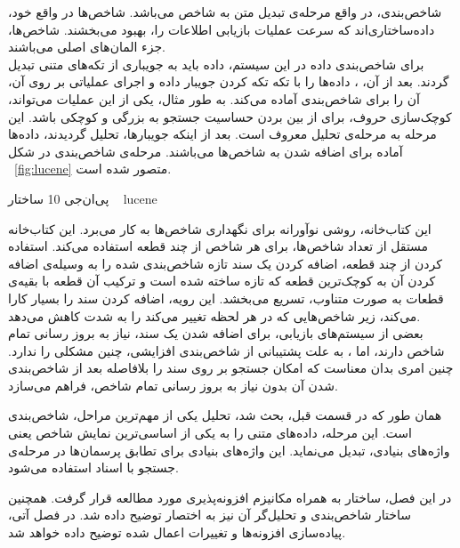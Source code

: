 شاخص‌بندی، در واقع مرحله‌ی تبدیل متن به شاخص می‌باشد. شاخص‌ها در واقع خود، داده‌ساختاری‌اند که سرعت عملیات بازیابی اطلاعات را، بهبود می‌بخشند. شاخص‌ها، جزء المان‌های اصلی   می‌باشند.
\\
برای شاخص‌بندی داده در این سیستم، داده باید به جویباری از تکه‌های متنی تبدیل گردند. بعد از آن، ، داده‌ها را با تکه تکه کردن جویبار داده و اجرای عملیاتی بر روی آن، آن را برای شاخص‌بندی آماده می‌کند. به طور مثال، یکی از این عملیات می‌تواند، کوچک‌سازی حروف، برای از بین بردن حساسیت جستجو به بزرگی و کوچکی باشد. این مرحله به مرحله‌ی تحلیل معروف است. بعد از اینکه جویبارها، تحلیل گردیدند، داده‌ها آماده برای اضافه شدن به شاخص‌ها می‌باشند. مرحله‌ی شاخص‌بندی در شکل ~\ref {fig:lucene} متصور شده است.

‌پی‌ان‌جی {10} {ساختار 
~\cite{Text-search}} {lucene}

این کتاب‌خانه، روشی نوآورانه برای نگهداری شاخص‌ها به کار می‌برد. این کتاب‌خانه مستقل از تعداد شاخص‌ها، برای هر شاخص از چند قطعه استفاده می‌کند. استفاده کردن از چند قطعه، اضافه کردن یک سند تازه شاخص‌بندی شده را به وسیله‌ی اضافه کردن آن به کوچک‌ترین قطعه که تازه ساخته شده است و ترکیب آن قطعه با بقیه‌ی قطعات به صورت متناوب، تسریع می‌بخشد. این رویه، اضافه کردن سند را بسیار کارا می‌کند، زیر شاخص‌هایی که در هر لحظه تغییر می‌کند را به شدت کاهش می‌دهد.
\\
بعضی از سیستم‌های بازیابی، برای اضافه شدن یک سند، نیاز به بروز رسانی تمام شاخص دارند، اما ، به علت پشتیبانی از شاخص‌بندی افزایشی، چنین مشکلی را ندارد. چنین امری بدان معناست که  امکان جستجو بر روی سند را بلافاصله بعد از شاخص‌بندی شدن آن بدون نیاز به بروز رسانی تمام شاخص، فراهم می‌سازد.


همان طور که در قسمت قبل، بحث شد، تحلیل یکی از مهم‌ترین مراحل، شاخص‌بندی است. این مرحله، داده‌های متنی را به یکی از اساسی‌ترین نمایش شاخص یعنی واژه‌های بنیادی، تبدیل می‌نماید. این واژه‌های بنیادی برای تطابق پرسمان‌ها در مرحله‌ی جستجو با اسناد استفاده می‌شود.

در این فصل، ساختار  به همراه مکانیزم افزونه‌پذیری مورد مطالعه قرار گرفت. همچنین ساختار شاخص‌بندی  و تحلیل‌گر آن نیز به اختصار توضیح داده شد. در فصل آتی، پیاده‌سازی افزونه‌ها و تغییرات اعمال شده توضیح داده خواهد شد.
